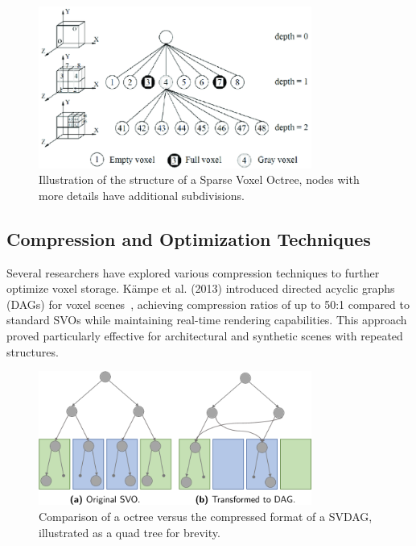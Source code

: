 \begin{figure}[thp]
    \caption{Illustration of the structure of a Sparse Voxel Octree, nodes with more details have additional
    subdivisions.~\protect\cite{truong2014octree}}
    \begin{center}
        \includegraphics[width=0.8\textwidth]{figures/svo.png}
    \end{center}
\end{figure}

\subsection{Compression and Optimization Techniques}
Several researchers have explored various compression techniques to further optimize voxel storage. Kämpe et al. (2013)
introduced directed acyclic graphs (DAGs) for voxel scenes~\cite{kampe2013high}, achieving compression ratios of up to
50:1 compared to standard SVOs while maintaining real-time rendering capabilities. This approach proved particularly
effective for architectural and synthetic scenes with repeated structures.

\begin{figure}[thp]
    \caption{Comparison of a octree versus the compressed format of a SVDAG, illustrated as a quad tree for brevity.
    \protect\cite{dolonius2018sparse}}
    \begin{center}
        \includegraphics[width=0.8\textwidth]{figures/svdag.png}
    \end{center}
\end{figure}

